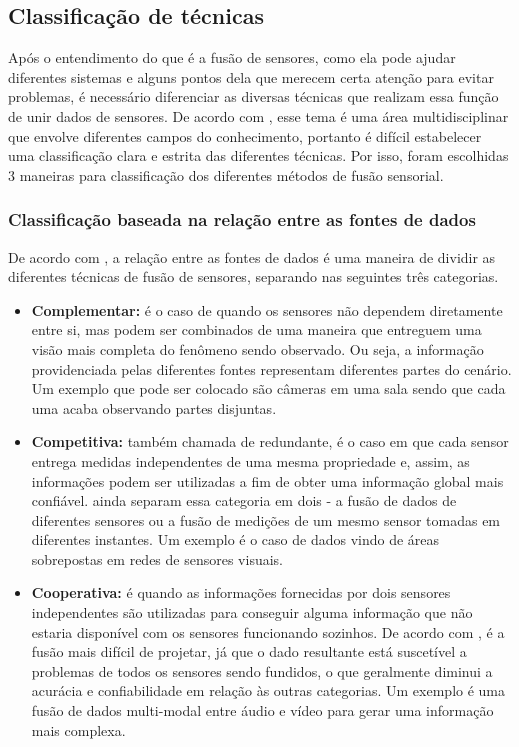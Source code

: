 \documentclass[acronym, symbols, table]{fei}
\begin{document}
		\subsection{Classificação de técnicas}
			Após o entendimento do que é a fusão de sensores, como ela pode ajudar diferentes sistemas e alguns pontos dela que merecem certa atenção para evitar problemas, é necessário diferenciar as diversas técnicas que realizam essa função de unir dados de sensores. De acordo com \textcite{castanedo2013review}, esse tema é uma área multidisciplinar que envolve diferentes campos do conhecimento, portanto é difícil estabelecer uma classificação clara e estrita das diferentes técnicas. Por isso, foram escolhidas 3 maneiras para classificação dos diferentes métodos de fusão sensorial.
			
			\subsubsection{Classificação baseada na relação entre as fontes de dados}
				De acordo com \textcite{castanedo2013review}, a relação entre as fontes de dados é uma maneira de dividir as diferentes técnicas de fusão de sensores, separando nas seguintes três categorias.
				
				\begin{itemize}
					\item \textbf{Complementar:} é o caso de quando os sensores não dependem diretamente entre si, mas podem ser combinados de uma maneira que entreguem uma visão mais completa do fenômeno sendo observado. Ou seja, a informação providenciada pelas diferentes fontes representam diferentes partes do cenário. Um exemplo que pode ser colocado são câmeras em uma sala sendo que cada uma acaba observando partes disjuntas.
					
					\item \textbf{Competitiva:} também chamada de redundante, é o caso em que cada sensor entrega medidas independentes de uma mesma propriedade e, assim, as informações podem ser utilizadas a fim de obter uma informação global mais confiável. \textcite{visser1999organisation} ainda separam essa categoria em dois - a fusão de dados de diferentes sensores ou a fusão de medições de um mesmo sensor tomadas em diferentes instantes. Um exemplo é o caso de dados vindo de áreas sobrepostas em redes de sensores visuais.
					
					\item \textbf{Cooperativa:} é quando as informações fornecidas por dois sensores independentes são utilizadas para conseguir alguma informação que não estaria disponível com os sensores funcionando sozinhos. De acordo com \textcite{brooks1998multi}, é a fusão mais difícil de projetar, já que o dado resultante está suscetível a problemas de todos os sensores sendo fundidos, o que geralmente diminui a acurácia e confiabilidade em relação às outras categorias. Um exemplo é uma fusão de dados multi-modal entre áudio e vídeo para gerar uma informação mais complexa.
				\end{itemize}
				
\end{document}

